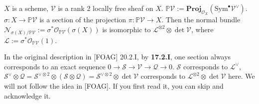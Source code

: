 
\begin{lemma}[20.2.I]
    $X$ is a scheme, $\mathcal{V}$ is a rank 2 locally
free sheaf on $X$. 
$\mathbb{P}\mathcal{V}:=\mathbf{Proj}_{\mathcal{O}_X}(\mathrm{Sym}^{\bullet}\mathcal{V}^{\vee})$.
$\sigma: X \to \mathbb{P}\mathcal{V}$ is a section of the projection $\pi: \mathbb{P}\mathcal{V} \to X$.
Then the normal bundle $\mathcal{N}_{\sigma(X)/\mathbb{P}\mathcal{V}}:= \sigma^*\mathcal{O}_{\mathbb{P}\mathcal{V}}(\sigma(X))$ 
is isomorphic to $\mathcal{L}^{\otimes 2}\otimes \det\mathcal{V}$,
where $\mathcal{L}:= \sigma^*\mathcal{O}_{\mathbb{P}\mathcal{V}}(1)$.
\end{lemma}
\begin{remark}
    In the original description in [FOAG] 20.2.I, 
    by \textbf{17.2.I},
    one section always corresponds to an exact sequence $0\to \mathscr{S}\to \mathscr{V}\to \mathscr{Q}\to 0$.
    $\mathscr{S}$ corresponds to $\mathcal{L}^{\vee}$, 
    $\mathscr{S}^{\vee}\otimes\mathscr{Q}=\mathscr{S}^{\vee \otimes 2}\otimes(\mathscr{S}\otimes\mathscr{Q})=\mathscr{S}^{\vee \otimes 2}\otimes\det \mathscr{V}$ 
    corresponds to $\mathcal{L}^{\otimes 2}\otimes\det\mathcal{V}$ here.
    We will not follow the idea in [FOAG].
    If you first read it, you can skip and acknowledge it.
\end{remark}

